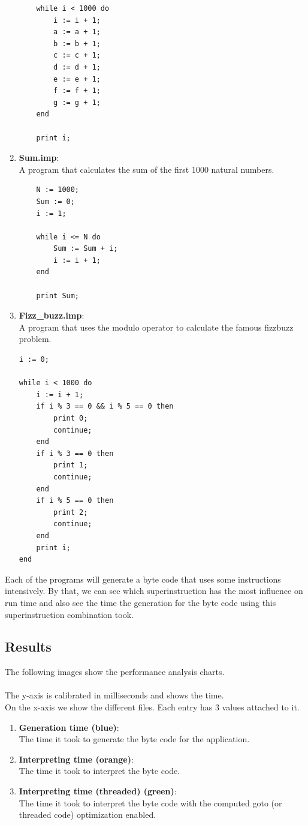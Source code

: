 \documentclass{article}
\begin{document}
\begin{enumerate}
\begin{verbatim}
    while i < 1000 do
        i := i + 1;
        a := a + 1;
        b := b + 1;
        c := c + 1;
        d := d + 1;
        e := e + 1;
        f := f + 1;
        g := g + 1;
    end

    print i;
\end{verbatim}

    \item \textbf{Sum.imp}:\\
    \label{item:inc_loop}
    A program that calculates the sum of the first 1000 natural numbers.
\begin{verbatim}
    N := 1000;
    Sum := 0;
    i := 1;

    while i <= N do
        Sum := Sum + i;
        i := i + 1;
    end

    print Sum;
\end{verbatim}
    \item \textbf{Fizz\_buzz.imp}:\\
    A program that uses the modulo operator to calculate the famous fizzbuzz problem.
\begin{verbatim}
i := 0;

while i < 1000 do
    i := i + 1;
    if i % 3 == 0 && i % 5 == 0 then
        print 0;
        continue;
    end
    if i % 3 == 0 then
        print 1;
        continue;
    end
    if i % 5 == 0 then
        print 2;
        continue;
    end
    print i;
end
\end{verbatim}
\end{enumerate}

Each of the programs will generate a byte code that uses some instructions
intensively. By that, we can see which superinstruction has the most influence on
run time and also see the time the generation for the byte code using this
superinstruction combination took.

\subsection{Results}
The following images show the performance analysis charts.
\\\\
The y-axis is calibrated in milliseconds and shows the time.
\\
On the x-axis we show the different files. Each entry has 3 values attached to it.

\begin{enumerate}
    \item \textbf{Generation time (blue)}:\\
        The time it took to generate the byte code for the application.
    \item \textbf{Interpreting time (orange)}:\\
        The time it took to interpret the byte code.
    \item \textbf{Interpreting time (threaded) (green)}:\\
        The time it took to interpret the byte code with the computed goto (or
        threaded code) optimization enabled.
\end{enumerate}
\end{document}
